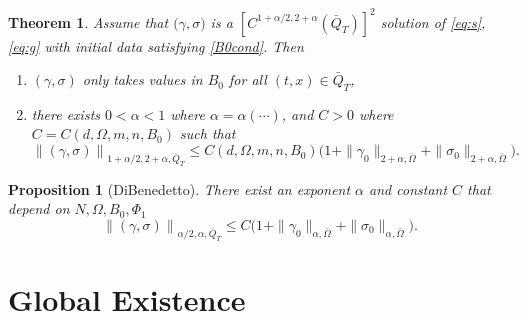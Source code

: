 \documentclass[a4paper,11pt]{article}
\newtheorem{theorem}{Theorem}
\newtheorem{proposition}{Proposition}[section]
\theoremstyle{remark}
\begin{document}
\begin{theorem} \label{a priori} Assume that $\big(\gamma,\sigma\big)$ is a $\left[C^{1+\alpha/2, 2+\alpha}(\bar{Q}_T)\right]^2$ solution of \eqref{eq:s},\eqref{eq:g} with initial data satisfying \eqref{B0cond}. Then 
\begin{enumerate}
 \item $(\gamma,\sigma)$ only takes values in $B_0$ for all $(t,x) \in \bar{Q}_T$,
 \item there exists $0< \alpha < 1$  where $\alpha = \alpha(\cdots)$, and $C>0$ where $C= C(d,\Omega,m,n,B_0)$ such that
\begin{equation}
 \left\| (\gamma,\sigma)\right\|_{1+\alpha/2, 2+\alpha, \bar{Q}_T} \le C(d,\Omega,m,n,B_0)\Big(1 + \|\gamma_0\|_{2+\alpha,\bar\Omega} +  \|\sigma_0\|_{2+\alpha,\bar\Omega}\Big).
\end{equation}
\end{enumerate}
 
\end{theorem}


\begin{proposition}[DiBenedetto] There exist an exponent $\alpha$ and constant $C$ that depend on $N,\Omega,B_0,\Phi_1$
\begin{equation}
 \left\| (\gamma,\sigma)\right\|_{\alpha/2, \alpha, \bar{Q}_T} \le C\Big(1 + \|\gamma_0\|_{\alpha,\bar\Omega} +  \|\sigma_0\|_{\alpha,\bar\Omega}\Big).
\end{equation} 
\end{proposition}



\section{Global Existence}
\end{document}
